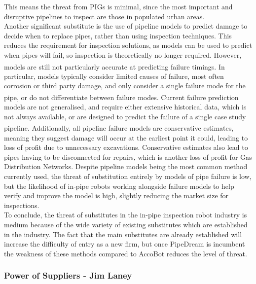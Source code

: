 \documentclass[11pt]{article}		%
\newcommand{\supercite}[1]{\textsuperscript{\cite{#1}}}		%
\begin{document}
				This means the threat from PIGs is minimal, since the most important and disruptive pipelines to inspect are those in populated urban areas.
				\\
                \hspace*{3ex}Another significant substitute is the use of pipeline models to predict damage to decide when to replace pipes, rather than using inspection techniques.
				This reduces the requirement for inspection solutions, as models can be used to predict when pipes will fail, so inspection is theoretically no longer required.
				However, models are still not particularly accurate at predicting failure timings\supercite{zakikhani2020review}.
				In particular, models typically consider limited causes of failure, most often corrosion or third party damage, and only consider a single failure mode for the pipe, or  do not differentiate between failure modes\supercite{zakikhani2020review}.
				Current failure prediction models are not generalised, and require either extensive historical data, which is not always available, or are designed to predict the failure of a single case study pipeline\supercite{zakikhani2020review}.
				Additionally, all pipeline failure models are conservative estimates, meaning they suggest damage will occur at the earliest point it could, leading to loss of profit due to unnecessary excavations.
				Conservative estimates also lead to pipes having to be disconnected for repairs, which is another loss of profit for Gas Distribution Networks.
				Despite pipeline models being the most common method currently used, the threat of substitution entirely by models of pipe failure is low, but the likelihood of in-pipe robots working alongside failure models to help verify and improve the model is high, slightly reducing the market size for inspections. 
				\\
                \hspace*{3ex}To conclude, the threat of substitutes in the in-pipe inspection robot industry is medium because of the wide variety of existing substitutes which are established in the industry.
				The fact that the main substitutes are already established will increase the difficulty of entry as a new firm, but once PipeDream is incumbent the weakness of these methods compared to AccoBot reduces the level of threat.
				
			\subsubsection{Power of Suppliers - Jim Laney}
				
\end{document}
